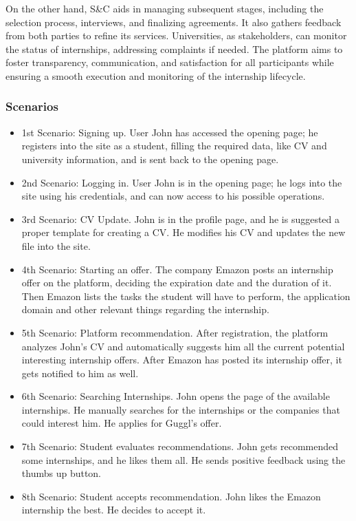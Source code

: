 \documentclass{article}
\begin{document}
On the other hand, S\&C aids in managing subsequent stages, including the selection process, interviews, and finalizing agreements. It also gathers feedback from both parties to refine its services. 
Universities, as stakeholders, can monitor the status of internships, addressing complaints if needed. The platform aims to foster transparency, communication, and satisfaction for all participants while ensuring a smooth execution and monitoring of the internship lifecycle.
\subsubsection{Scenarios}
    \begin{itemize}
        \item 1st Scenario: Signing up. User John has accessed the opening page; he registers into the site as a student, filling the required data, like CV and university information, and is sent back to the opening page.
        \item 2nd Scenario: Logging in. User John is in the opening page; he logs into the site using his credentials, and can now access to his possible operations.
        \item 3rd Scenario: CV Update. John is in the profile page, and he is suggested a proper template for creating a CV. He modifies his CV and updates the new file into the site.
        \item 4th Scenario: Starting an offer. The company Emazon posts an internship offer on the platform, deciding the expiration date and the duration of it. Then Emazon lists the tasks the student will have to perform, the application domain and other relevant things regarding the internship.  
        \item 5th Scenario: Platform recommendation. After registration, the platform analyzes John's CV and automatically suggests him all the current potential interesting internship offers. After Emazon has posted its internship offer, it gets notified to him as well.
        \item 6th Scenario: Searching Internships. John opens the page of the available internships. He manually searches for the internships or the companies that could interest him. He applies for Guggl's offer.
        \item 7th Scenario: Student evaluates recommendations. John gets recommended some internships, and he likes them all. He sends positive feedback using the thumbs up button.
        \item 8th Scenario: Student accepts recommendation. John likes the Emazon internship the best. He decides to accept it.

\end{itemize}
\end{document}
